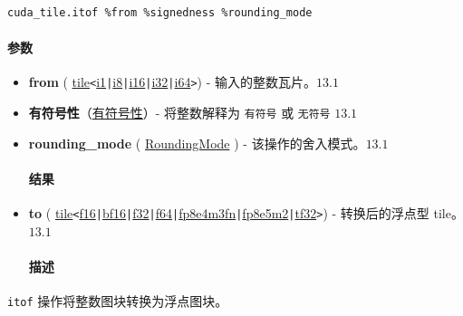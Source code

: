 \documentclass{article}
\begin{document}
\begin{lstlisting}
cuda_tile.itof %from %signedness %rounding_mode
\end{lstlisting}

\paragraph{参数}

\begin{itemize}
\item \textbf{from} ( \href{https://docs.nvidia.com/cuda/tile-ir/latest/sections/types.html#type-tile}{tile}\texttt{<}\href{https://docs.nvidia.com/cuda/tile-ir/latest/sections/types.html#subsection-element-types}{i1}\texttt{|}\href{https://docs.nvidia.com/cuda/tile-ir/latest/sections/types.html#subsection-element-types}{i8}\texttt{|}\href{https://docs.nvidia.com/cuda/tile-ir/latest/sections/types.html#subsection-element-types}{i16}\texttt{|}\href{https://docs.nvidia.com/cuda/tile-ir/latest/sections/types.html#subsection-element-types}{i32}\texttt{|}\href{https://docs.nvidia.com/cuda/tile-ir/latest/sections/types.html#subsection-element-types}{i64}\texttt{>}) - 输入的整数瓦片。$\boxed{13.1}$
\item \textbf{有符号性}（\href{https://docs.nvidia.com/cuda/tile-ir/latest/sections/operations.html#op-attribute-cuda-tile-itof-signedness-attr}{有符号性}）- 将整数解释为 \texttt{有符号} 或 \texttt{无符号} $\boxed{13.1}$
\item \textbf{rounding\_mode} ( \href{https://docs.nvidia.com/cuda/tile-ir/latest/sections/operations.html#op-attribute-cuda-tile-itof-roundingmode-attr}{RoundingMode} ) - 该操作的舍入模式。$\boxed{13.1}$


\paragraph{结果}

\item \textbf{to} ( \href{https://docs.nvidia.com/cuda/tile-ir/latest/sections/types.html#type-tile}{tile}\texttt{<}\href{https://docs.nvidia.com/cuda/tile-ir/latest/sections/types.html#subsection-element-types}{f16}\texttt{|}\href{https://docs.nvidia.com/cuda/tile-ir/latest/sections/types.html#subsection-element-types}{bf16}\texttt{|}\href{https://docs.nvidia.com/cuda/tile-ir/latest/sections/types.html#subsection-element-types}{f32}\texttt{|}\href{https://docs.nvidia.com/cuda/tile-ir/latest/sections/types.html#subsection-element-types}{f64}\texttt{|}\href{https://docs.nvidia.com/cuda/tile-ir/latest/sections/types.html#subsection-element-types}{fp8e4m3fn}\texttt{|}\href{https://docs.nvidia.com/cuda/tile-ir/latest/sections/types.html#subsection-element-types}{fp8e5m2}\texttt{|}\href{https://docs.nvidia.com/cuda/tile-ir/latest/sections/types.html#subsection-element-types}{tf32}\texttt{>}) - 转换后的浮点型 tile。$\boxed{13.1}$


\paragraph{描述}

\end{itemize}
\texttt{itof} 操作将整数图块转换为浮点图块。
\end{document}
